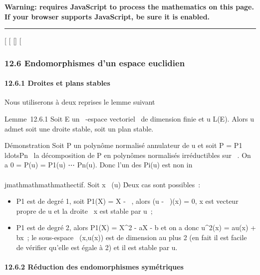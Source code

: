\textbf{Warning: 
requires JavaScript to process the mathematics on this page.\\ If your
browser supports JavaScript, be sure it is enabled.}

\begin{center}\rule{3in}{0.4pt}\end{center}

{[}
{[}
{[}{]}
{[}

\subsubsection{12.6 Endomorphismes d'un espace euclidien}

\paragraph{12.6.1 Droites et plans stables}

Nous utiliserons à deux reprises le lemme suivant

Lemme~12.6.1 Soit E un ~-espace vectoriel ~de dimension finie et u \in
L(E). Alors u admet soit une droite stable, soit un plan stable.

Démonstration Soit P un polynôme normalisé annulateur de u et soit P =
P1\\ldotsPn~
la décomposition de P en polynômes normalisés irréductibles sur ~. On a
0 = P(u) = P1(u) \cdot⋯ \cdot
Pn(u). Donc l'un des Pi(u) est non in\\\\jmathmathmathmathectif. Soit x
\in\mathrmKerPi~(u)
\diagdown\0\. Deux cas sont possibles~:

\begin{itemize}
\itemsep1pt\parskip0pt
\item
  P1 est de degré 1, soit P1(X) = X - \lambda~, alors (u -
  \lambda~\mathrmId)(x) = 0, x est vecteur propre de u et la
  droite ~x est stable par u~;
\item
  P1 est de degré 2, alors P1(X) = X^2 -
  aX - b et on a donc u^2(x) = au(x) + bx~; le sous-espace
  \mathrmVect~(x,u(x)) est
  de dimension au plus 2 (en fait il est facile de vérifier qu'elle est
  égale à 2) et il est stable par u.
\end{itemize}

\paragraph{12.6.2 Réduction des endomorphismes symétriques}

